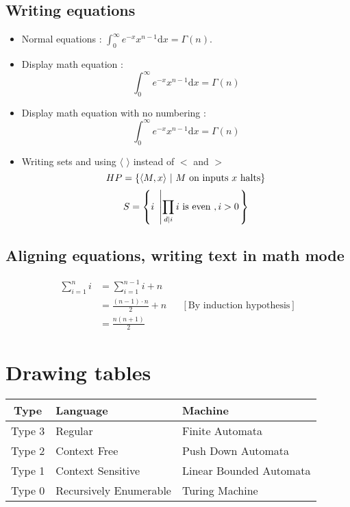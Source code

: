 \subsection{Writing equations}
\begin{itemize}
\item Normal equations : 
	$\int_0^\infty e^{-x} x^{n-1} \mathrm{d}x = \Gamma(n)$.
\item Display math equation : 
	\begin{equation}
	\int_0^\infty e^{-x} x^{n-1} \mathrm{d}x = \Gamma(n)
	\end{equation}
\item Display math equation with no numbering : 
	\begin{equation*}
	\int_0^\infty e^{-x} x^{n-1} \mathrm{d}x = \Gamma(n)
	\end{equation*}
\item Writing sets and using $\langle$ $\rangle$ instead of $<$ and $>$
	\begin{equation}
	HP = {\left\{  \langle M,x \rangle ~|~ \text{$M$ on inputs $x$ halts}  \right\}}
	\end{equation}
	\begin{equation}
	S =  {\left\{  i ~\left |  \prod_{d | i} i \text{ is even }, i > 0 \right .  \right\}}
	\end{equation}
\end{itemize}

\subsection{Aligning equations, writing text in math mode}
\begin{align*}
\sum_{i=1}^n i & = \sum_{i=1}^{n-1} i + n \\
			   & = \frac{(n-1)\cdot n}{2} + n && [\text{By induction hypothesis}]\\
			   & = \frac{n(n+1)}{2}
\end{align*}




\section{Drawing tables}
\begin{center}
\begin{tabular}{||c|l|l||}
\hline 
\textbf{Type} & \textbf{Language} & \textbf{Machine} \\ 
\hline \hline
Type 3 & Regular & Finite Automata \\ 
\hline 
Type 2 & Context Free & Push Down Automata \\ 
\hline 
Type 1 & Context Sensitive & Linear Bounded Automata \\ 
\hline
Type 0 & Recursively Enumerable & Turing Machine \\ 
\hline 
\end{tabular} 
\end{center}


